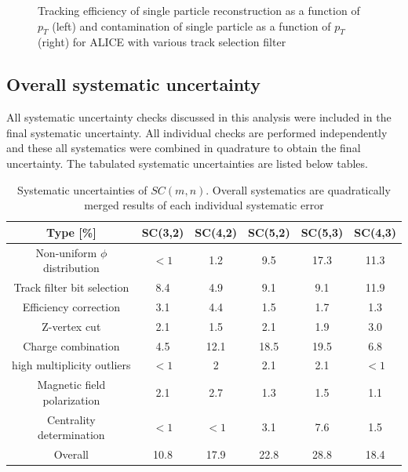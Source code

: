 \begin{figure}[!p]
\begin{center}
        \caption{Tracking efficiency of single particle reconstruction as a function of $p_T$ (left) and contamination of single particle as a function of $p_T$ (right) for ALICE with various track selection filter}
        \label{fig:eff}
        \end{center}   
     \end{figure}



\subsection{Overall systematic uncertainty}

All systematic uncertainty checks discussed in this analysis were included in the final systematic uncertainty. All individual checks are performed independently and these all systematics were combined in quadrature to obtain the final uncertainty. The tabulated systematic uncertainties are listed below tables.

\begin{table}[!p]
\begin{tabular}{c|c|c|c|c|c}
 
  Type  [\%]						&   SC(3,2)   &  SC(4,2) & SC(5,2) & SC(5,3) & SC(4,3)\\   \hline  \hline
  Non-uniform $\phi$ distribution	& $<1$	& 1.2	&9.5 	&17.3	&11.3	  	\\ \hline
  Track filter bit selection 		& 8.4	& 4.9	&9.1	&9.1		&11.9	 	\\ \hline
  Efficiency correction				& 3.1	& 4.4	&1.5	&1.7		&1.3	 \\ \hline
  Z-vertex cut						& 2.1	& 1.5	&2.1	&1.9		&3.0	\\ \hline
  Charge combination				& 4.5	& 12.1	&18.5	&19.5	&6.8 	\\ \hline
  high multiplicity outliers			& $<1$	& 2		&2.1	&2.1		&$<1$	\\ \hline
  Magnetic field polarization		& 2.1	& 2.7	&1.3	&1.5		&1.1	 \\ \hline   
  Centrality determination			& $<1$	& $<1$	&3.1	&7.6		&1.5 	\\ \hline   \hline
  Overall 							& 10.8	& 17.9	&22.8	&28.8	&18.4
  
\end{tabular}
\caption{Systematic uncertainties of $SC(m,n)$. Overall systematics are quadratically merged results of each individual systematic error}
\end{table}

